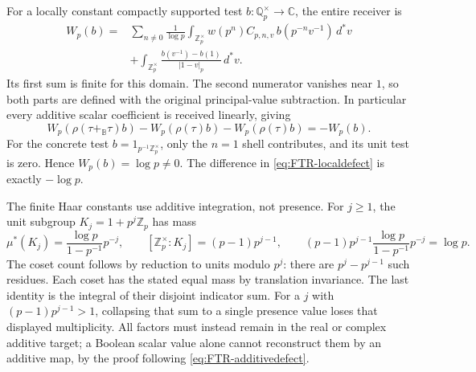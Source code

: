 For a locally constant compactly supported test
$b:\mathbb Q_p^\times\to\mathbb C$, the entire receiver is
\begin{equation}\tag{FTR12}\label{eq:FTR-localfull}
 \begin{aligned}
 W_p(b)={}&\sum_{n\ne0}\frac1{\log p}
  \int_{\mathbb Z_p^\times}
      w(p^n)C_{p,n,v}\,b(p^{-n}v^{-1})\,d^*v\\
 &+\int_{\mathbb Z_p^\times}
        \frac{b(v^{-1})-b(1)}{|1-v|_p}\,d^*v.
 \end{aligned}
\end{equation}
Its first sum is finite for this domain. The second numerator
vanishes near $1$, so both parts are defined with the original
principal-value subtraction. In particular every additive scalar
coefficient is received linearly, giving
\begin{equation}\tag{FTR13}\label{eq:FTR-localdefect}
 W_p(\rho(\tau+_{\mathbb B}\tau)b)
       -W_p(\rho(\tau)b)-W_p(\rho(\tau)b)=-W_p(b).
\end{equation}
For the concrete test $b=1_{p^{-1}\mathbb Z_p^\times}$, only
the $n=1$ shell contributes, and its unit test is zero. Hence
$W_p(b)=\log p\ne0$. The difference in
\eqref{eq:FTR-localdefect} is exactly $-\log p$.

The finite Haar constants use additive integration, not presence.
For $j\geq1$, the unit subgroup $K_j=1+p^j\mathbb Z_p$ has
mass
\begin{equation}\tag{FTR14}\label{eq:FTR-Haarpartition}
 \mu^*(K_j)=\frac{\log p}{1-p^{-1}}p^{-j},\qquad
 [\mathbb Z_p^\times:K_j]=(p-1)p^{j-1},\qquad
 (p-1)p^{j-1}\frac{\log p}{1-p^{-1}}p^{-j}=\log p.
\end{equation}
The coset count follows by reduction to units modulo $p^j$:
there are $p^j-p^{j-1}$ such residues. Each coset has the stated
equal mass by translation invariance. The last identity is the
integral of their disjoint indicator sum. For a $j$ with
$(p-1)p^{j-1}>1$, collapsing that sum to a single presence value
loses that displayed multiplicity. All factors must instead remain
in the real or complex additive target; a Boolean scalar value
alone cannot reconstruct them by an additive map, by the proof
following \eqref{eq:FTR-additivedefect}.

